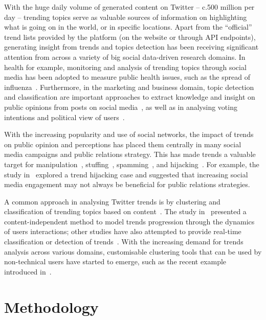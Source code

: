 \documentclass{llncs}
\begin{document}
With the huge daily volume of generated content on Twitter -- c.500
million per day -- trending topics serve as valuable sources of
information on highlighting what is going on in the world, or in
specific locations. Apart from the ``official'' trend lists provided
by the platform (on the website or through API endpoints), generating
insight from trends and topics detection has been receiving
significant attention from across a variety of big social data-driven
research domains. In health for example, monitoring and analysis of
trending topics through social media has been adopted to measure
public health issues, such as the spread of
influenza~\cite{Achrekar2011,Parker2013,Parker2015,Majak2017}. Furthermore,
in the marketing and business domain, topic detection and
classification are important approaches to extract knowledge and
insight on public opinions from posts on social
media~\cite{Bello2013}, as well as in analysing voting intentions and
political view of users~\cite{Fang2015}.

With the increasing popularity and use of social networks, the impact
of trends on public opinion and perceptions has placed them centrally
in many social media campaigns and public relations strategy. This has
made trends a valuable target for manipulation~\cite{Zhang2017},
stuffing~\cite{Irani2010}, spamming~\cite{Sedhai2015,Chu2012}, and
hijacking~\cite{VanDam2016}. For example, the study
in~\cite{Sanderson2016} explored a trend hijacking case and suggested
that increasing social media engagement may not always be beneficial
for public relations strategies.

A common approach in analysing Twitter trends is by clustering and
classification of trending topics based on
content~\cite{Zubiaga2011,Benhardus2013,Ferragina2015,albishry-et-al:iccci2017}. The
study in~\cite{TenThij2016} presented a content-independent method to
model trends progression through the dynamics of users interactions;
other studies have also attempted to provide real-time classification
or detection of trends~\cite{Mathioudakis2010,Zubiaga2015}. With the
increasing demand for trends analysis across various domains,
customisable clustering tools that can be used by non-technical users
have started to emerge, such as the recent example introduced
in~\cite{Arn2018}.


\section{Methodology}\label{method}
\end{document}
